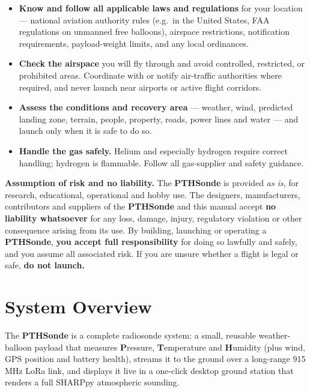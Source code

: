 \documentclass[11pt,openany]{report}
\newcommand{\PTH}{\texorpdfstring{\textbf{PTH}\textcolor{tlorange}{\textbf{Sonde}}}{PTHSonde}}
\begin{document}
\begin{itemize}
  \item \textbf{Know and follow all applicable laws and regulations} for your location
        --- national aviation authority rules (e.g.\ in the United States, FAA
        regulations on unmanned free balloons), airspace restrictions, notification
        requirements, payload-weight limits, and any local ordinances.
  \item \textbf{Check the airspace} you will fly through and avoid controlled,
        restricted, or prohibited areas. Coordinate with or notify air-traffic
        authorities where required, and never launch near airports or active flight
        corridors.
  \item \textbf{Assess the conditions and recovery area} --- weather, wind, predicted
        landing zone, terrain, people, property, roads, power lines and water --- and
        launch only when it is safe to do so.
  \item \textbf{Handle the gas safely.} Helium and especially hydrogen require correct
        handling; hydrogen is flammable. Follow all gas-supplier and safety guidance.
\end{itemize}

\vspace{4pt}
\noindent
\textbf{Assumption of risk and no liability.} The \PTH{} is provided \emph{as is}, for
research, educational, operational and hobby use. The designers, manufacturers, contributors and
suppliers of the \PTH{} and this manual accept \textbf{no liability whatsoever} for any
loss, damage, injury, regulatory violation or other consequence arising from its use.
By building, launching or operating a \PTH{}, \textbf{you accept full responsibility}
for doing so lawfully and safely, and you assume all associated risk. If you are unsure
whether a flight is legal or safe, \textbf{do not launch.}

\clearpage

\chapter{System Overview}

The \PTH{} is a complete radiosonde system: a small, reusable weather-balloon
payload that measures \textbf{P}ressure, \textbf{T}emperature and \textbf{H}umidity
(plus wind, GPS position and battery health), streams it to the ground over a
long-range 915\,MHz LoRa link, and displays it live in a one-click desktop
ground station that renders a full SHARPpy atmospheric sounding.
\end{document}
